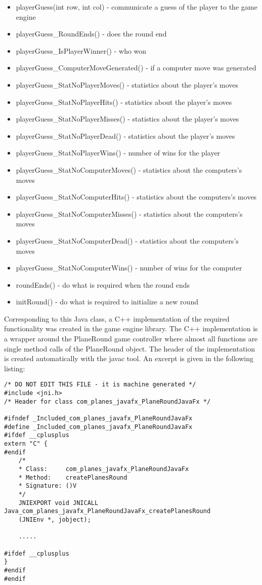 \begin{itemize}
	\item playerGuess(int row, int col) - communicate a guess of the player to the game engine
	\item playerGuess\_RoundEnds() - does the round end
	\item playerGuess\_IsPlayerWinner() - who won
	\item playerGuess\_ComputerMoveGenerated() - if a computer move was generated
	\item playerGuess\_StatNoPlayerMoves() - statistics about the player's moves
	\item playerGuess\_StatNoPlayerHits() - statistics about the player's moves
	\item playerGuess\_StatNoPlayerMisses() - statistics about the player's moves
	\item playerGuess\_StatNoPlayerDead() - statistics about the player's moves
	\item playerGuess\_StatNoPlayerWins() - number of wins for the player
	\item playerGuess\_StatNoComputerMoves() - statistics about the computers's moves
	\item playerGuess\_StatNoComputerHits() - statistics about the computers's moves
	\item playerGuess\_StatNoComputerMisses() - statistics about the computers's moves
	\item playerGuess\_StatNoComputerDead() - statistics about the computers's moves
	\item playerGuess\_StatNoComputerWins() - number of wins for the computer
	
	\item roundEnds() - do what is required when the round ends
	\item initRound() - do what is required to initialize a new round

\end{itemize}

Corresponding to this Java class, a C++ implementation of the required functionality was created in the game engine library. The C++ implementation is a wrapper around the PlaneRound game controller where almost all functions are single method calls of the PlaneRound object. The header of the implementation is created automatically with the javac tool. An excerpt is given in the following listing:

\begin{lstlisting} 
/* DO NOT EDIT THIS FILE - it is machine generated */
#include <jni.h>
/* Header for class com_planes_javafx_PlaneRoundJavaFx */

#ifndef _Included_com_planes_javafx_PlaneRoundJavaFx
#define _Included_com_planes_javafx_PlaneRoundJavaFx
#ifdef __cplusplus
extern "C" {
#endif
	/*
	* Class:     com_planes_javafx_PlaneRoundJavaFx
	* Method:    createPlanesRound
	* Signature: ()V
	*/
	JNIEXPORT void JNICALL Java_com_planes_javafx_PlaneRoundJavaFx_createPlanesRound
	(JNIEnv *, jobject);
	
	.....

#ifdef __cplusplus
}
#endif
#endif

\end{lstlisting}

